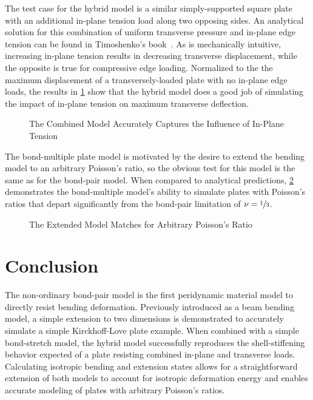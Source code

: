 \documentclass[preprint,review,12pt]{elsarticle}
\newcommand{\plotpath}{./plots}
\begin{document}
The test case for the hybrid model is a similar simply-supported square plate with an additional in-plane tension load along two opposing sides.  An analytical solution for this combination of uniform transverse pressure and in-plane edge tension can be found in Timoshenko's book~\cite{timoshenko1959theory}.  As is mechanically intuitive, increasing in-plane tension results in decreasing transverse displacement, while the opposite is true for compressive edge loading.  Normalized to the the maximum displacement of a transversely-loaded plate with no in-plane edge loads, the results in \cref{fig:plateStiffening} show that the hybrid model does a good job of simulating the impact of in-plane tension on maximum transverse deflection.
%
\begin{figure}[tbp]
  \centering
  \resizebox{0.55\linewidth}{!}{}
  \caption{The Combined Model Accurately Captures the Influence of In-Plane Tension}
  \label{fig:plateStiffening}
\end{figure}
%
The bond-multiple plate model is motivated by the desire to extend the bending model to an arbitrary Poisson's ratio, so the obvious test for this model is the same as for the bond-pair model. When compared to analytical predictions, \cref{fig:plate_poisson} demonstrates the bond-multiple model's ability to simulate plates with Poisson's ratios that depart significantly from the bond-pair limitation of $\nu = \sfrac{1}{3}$.
%
\begin{figure}[tbp]
  \centering
  \resizebox{0.55\linewidth}{!}{}
  \caption{The Extended Model Matches for Arbitrary Poisson's Ratio}
  \label{fig:plate_poisson}
\end{figure}


\section{Conclusion}
The non-ordinary bond-pair model is the first peridynamic material model to directly resist bending deformation.  Previously introduced as a beam bending model, a simple extension to two dimensions is demonstrated to accurately simulate a simple Kirckhoff-Love plate example.  When combined with a simple bond-stretch model, the hybrid model successfully reproduces the shell-stiffening behavior expected of a plate resisting combined in-plane and transverse loads.  Calculating isotropic bending and extension states allows for a straightforward extension of both models to account for isotropic deformation energy and enables accurate modeling of plates with arbitrary Poisson's ratios.
\end{document}
